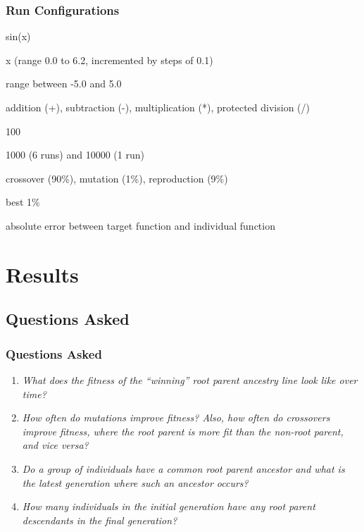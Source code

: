 \documentclass{beamer}
\begin{document}
\begin{frame}
\frametitle{Run Configurations}
\begin{description}[align=left, leftmargin=*]
{\small
\item[Target Function] sin(x)
\item[Variables] x (range 0.0 to 6.2, incremented by steps of 0.1)
\item[Constants] range between -5.0 and 5.0
\item[Operations] addition (+), subtraction (-), multiplication (*), protected division (/)
\item[Generation Number] 100
\item[Population Size Per Gen] 1000 (6 runs) and 10000 (1 run)
\item[Transform Percentages] crossover (90\%), mutation (1\%), reproduction (9\%)
\item[Elitism] best 1\%
\item[Fitness] absolute error between target function and individual function
}
\end{description}
\end{frame}

\section[Results]{Results}

\subsection[Questions Asked]{Questions Asked}

\begin{frame}
\frametitle{Questions Asked}
\begin{enumerate}
\item \emph{What does the fitness of the ``winning'' root parent ancestry line look like over time?}
\item \emph{How often do mutations improve fitness? Also, how often do crossovers improve fitness, where the root parent is more fit than the non-root parent, and vice versa?}
\item \emph{Do a group of individuals have a common root parent ancestor and what is the latest generation where such an ancestor occurs?}
\item \emph{How many individuals in the initial generation have any root parent descendants in the final generation?}
\end{enumerate}
\end{frame}
\end{document}
